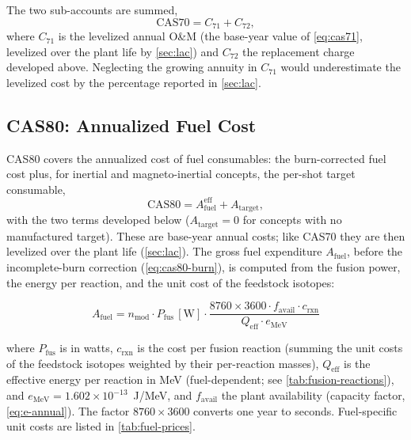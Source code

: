 \documentclass{article}
\begin{document}
The two sub-accounts are summed,
\begin{equation}
\label{eq:cas70-total}
\text{CAS70} = C_{71} + C_{72},
\end{equation}
where $C_{71}$ is the levelized annual O\&M (the base-year value of
\cref{eq:cas71}, levelized over the plant life by \cref{sec:lac}) and
$C_{72}$ the replacement charge developed above. Neglecting the growing
annuity in $C_{71}$ would underestimate the levelized cost by the
percentage reported in \cref{sec:lac}.


\subsection{CAS80: Annualized Fuel Cost}
\label{sec:cas80}

CAS80 covers the annualized cost of fuel consumables: the burn-corrected
fuel cost plus, for inertial and magneto-inertial concepts, the per-shot
target consumable,
\begin{equation}
\label{eq:cas80-total}
\text{CAS80} = A_{\text{fuel}}^{\text{eff}} + A_{\text{target}},
\end{equation}
with the two terms developed below ($A_{\text{target}} = 0$ for concepts
with no manufactured target). These are base-year annual costs; like
CAS70 they are then levelized over the plant life (\cref{sec:lac}). The gross fuel expenditure
$A_{\text{fuel}}$, before the incomplete-burn correction
(\cref{eq:cas80-burn}), is computed from the fusion power, the energy per
reaction, and the unit cost of the feedstock isotopes:

\begin{equation}
\label{eq:cas80-base}
A_{\text{fuel}} = n_{\text{mod}} \cdot P_{\text{fus}}\,[\text{W}] \cdot
  \frac{8760 \times 3600 \cdot f_{\text{avail}} \cdot c_{\text{rxn}}}
       {Q_{\text{eff}} \cdot e_{\text{MeV}}}
\end{equation}

\noindent where $P_{\text{fus}}$ is in watts, $c_{\text{rxn}}$ is the cost per fusion reaction
(summing the unit costs of the feedstock isotopes weighted by their
per-reaction masses), $Q_{\text{eff}}$ is the effective energy per
reaction in MeV (fuel-dependent; see \cref{tab:fusion-reactions}), and
$e_{\text{MeV}} = 1.602 \times 10^{-13}$~J/MeV, and $f_{\text{avail}}$ the
plant availability (capacity factor, \cref{eq:e-annual}). The factor
$8760 \times 3600$ converts one year to seconds. Fuel-specific
unit costs are listed in \cref{tab:fuel-prices}.
\end{document}
